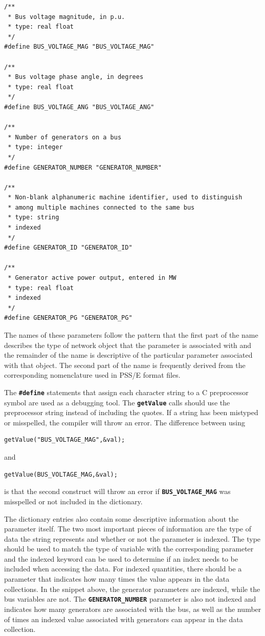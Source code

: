{
\color{red}
\begin{Verbatim}[fontseries=b]
/**
 * Bus voltage magnitude, in p.u.
 * type: real float
 */
#define BUS_VOLTAGE_MAG "BUS_VOLTAGE_MAG"

/**
 * Bus voltage phase angle, in degrees
 * type: real float
 */
#define BUS_VOLTAGE_ANG "BUS_VOLTAGE_ANG"

/**
 * Number of generators on a bus
 * type: integer
 */
#define GENERATOR_NUMBER "GENERATOR_NUMBER"

/**
 * Non-blank alphanumeric machine identifier, used to distinguish
 * among multiple machines connected to the same bus  
 * type: string
 * indexed
 */
#define GENERATOR_ID "GENERATOR_ID"

/**
 * Generator active power output, entered in MW 
 * type: real float
 * indexed
 */
#define GENERATOR_PG "GENERATOR_PG"
\end{Verbatim}
}

The names of these parameters follow the pattern that the first part of the name describes the type of network object that the parameter is associated with and the remainder of the name is descriptive of the particular parameter associated with that object. The second part of the name is frequently derived from the corresponding nomenclature used in PSS/E format files.

The \texttt{\textbf{\#define}} statements that assign each character string to a C preprocessor symbol are used as a debugging tool. The \texttt{\textbf{getValue}} calls should use the preprocessor string instead of including the quotes. If a string has been mistyped or misspelled, the compiler will throw an error. The difference between using

{
\color{red}
\begin{Verbatim}[fontseries=b]
getValue("BUS_VOLTAGE_MAG",&val);
\end{Verbatim}
}

and

{
\color{red}
\begin{Verbatim}[fontseries=b]
getValue(BUS_VOLTAGE_MAG,&val);
\end{Verbatim}
}

is that the second construct will throw an error if \texttt{\textbf{BUS\_VOLTAGE\_MAG}} was misspelled or not included in the dictionary.

The dictionary entries also contain some descriptive information about the parameter itself. The two most important pieces of information are the type of data the string represents and whether or not the parameter is indexed. The type should be used to match the type of variable with the corresponding parameter and the indexed keyword can be used to determine if an index needs to be included when accessing the data. For indexed quantities, there should be a parameter that indicates how many times the value appears in the data collections. In the snippet above, the generator parameters are indexed, while the bus variables are not. The \texttt{\textbf{GENERATOR\_NUMBER}} parameter is also not indexed and indicates how many generators are associated with the bus, as well as the number of times an indexed value associated with generators can appear in the data collection.

